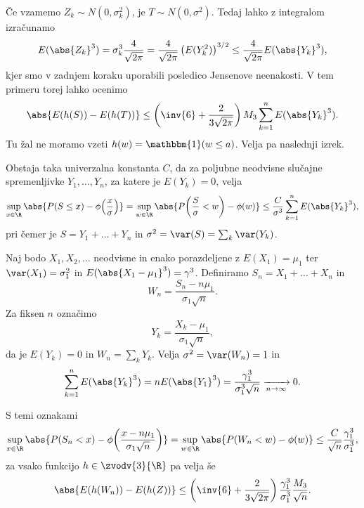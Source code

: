 Če vzamemo $Z_k \sim N(0, \sigma_k^2)$, je $T \sim N(0, \sigma^2)$.
Tedaj lahko z integralom izračunamo
\[
  E(\abs{Z_k}^3) = \sigma_k^3 \frac{4}{\sqrt{2 \pi}}
  = \frac{4}{\sqrt{2 \pi}} \left( E(Y_k^2) \right)^{3/2}
  \le \frac{4}{\sqrt{2 \pi}} E(\abs{Y_k}^3),
\]
kjer smo v zadnjem koraku uporabili posledico Jensenove neenakosti.
V tem primeru torej lahko ocenimo
\[
  \abs{E(h(S)) - E(h(T))}
  \le \left(\inv{6} + \frac{2}{3 \sqrt{2 \pi}}\right) M_3 \sum_{k=1}^n E(\abs{Y_k}^3).
\]
Tu žal ne moramo vzeti $h(w) = \mathbbm{1}(w \le a)$.
Velja pa naslednji izrek.

\begin{izrek}
  Obstaja taka univerzalna konstanta $C$, da za poljubne neodvisne slučajne
  spremenljivke $Y_1, \ldots, Y_n$, za katere je $E(Y_k) = 0$, velja
  \[
	\sup_{x \in \R} \abs{P(S \le x) - \phi\!\left(\frac{x}{\sigma}\right)}
	= \sup_{w \in \R} \abs{P\!\left(\frac{S}{\sigma} < w\right) - \phi(w)}
	\le \frac{C}{\sigma^3} \sum_{k=1}^n E(\abs{Y_k}^3),
  \]
  pri čemer je $S = Y_1 + \ldots + Y_n$ in $\sigma^2 = \var(S) = \sum_k
  \var(Y_k)$.
\end{izrek}

Naj bodo $X_1, X_2, \ldots$ neodvisne in enako porazdeljene z $E(X_1) = \mu_1$
ter $\var(X_1) = \sigma_1^2$ in $E(\abs{X_1 - \mu_1}^3) = \gamma^3$.
Definiramo $S_n = X_1 + \ldots + X_n$ in
\[
  W_n = \frac{S_n - n \mu_1}{\sigma_1 \sqrt{n}}.
\]
Za fiksen $n$ označimo
\[
  Y_k = \frac{X_k - \mu_1}{\sigma_1 \sqrt{n}},
\]
da je $E(Y_k) = 0$ in $W_n = \sum_k Y_k$.
Velja $\sigma^2 = \var(W_n) = 1$ in
\[
  \sum_{k=1}^n E(\abs{Y_k}^3) = n E(\abs{Y_1}^3) = \frac{\gamma_1^3}{\sigma_1^3
	\sqrt{n}}
  \xrightarrow[{n \to \infty}]{} 0.
\]

\begin{posledica}
  S temi oznakami
  \[
	\sup_{x \in \R} \abs{P(S_n < x) - \phi\!\left( \frac{x - n \mu_1}{\sigma_1
		  \sqrt{n}} \right)}
	= \sup_{w \in \R} \abs{P(W_n < w) - \phi(w)}
	\le \frac{C}{\sqrt{n}} \frac{\gamma_1^3}{\sigma_1^3},
  \]
  za vsako funkcijo $h \in \zvodv{3}{\R}$ pa velja še
  \[
	\abs{E(h(W_n)) - E(h(Z))}
	\le \left( \inv{6} + \frac{2}{3 \sqrt{2 \pi}} \right)
	\frac{\gamma_1^3}{\sigma_1^3} \frac{M_3}{\sqrt{n}}.
  \]
\end{posledica}

